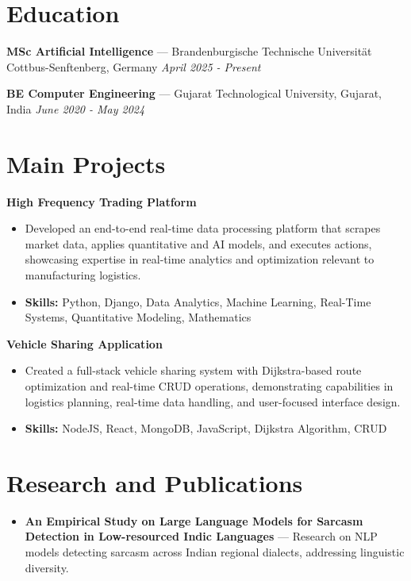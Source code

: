 \documentclass[a4paper,10pt]{article}
\begin{document}
\section*{Education}
\textbf{MSc Artificial Intelligence} — Brandenburgische Technische Universität Cottbus-Senftenberg, Germany \hfill \textit{April 2025 - Present}\par
\vspace{1.5pt}
\textbf{BE Computer Engineering} — Gujarat Technological University, Gujarat, India \hfill \textit{June 2020 - May 2024}\par

\section*{Main Projects}
\textbf{High Frequency Trading Platform}\par
\vspace{1pt}
\begin{itemize}
  \item Developed an end-to-end real-time data processing platform that scrapes market data, applies quantitative and AI models, and executes actions, showcasing expertise in real-time analytics and optimization relevant to manufacturing logistics.
  \item \textbf{Skills:} Python, Django, Data Analytics, Machine Learning, Real-Time Systems, Quantitative Modeling, Mathematics
\end{itemize}
\vspace{3pt}
\textbf{Vehicle Sharing Application}\par
\vspace{1pt}
\begin{itemize}
  \item Created a full-stack vehicle sharing system with Dijkstra-based route optimization and real-time CRUD operations, demonstrating capabilities in logistics planning, real-time data handling, and user-focused interface design.
  \item \textbf{Skills:} NodeJS, React, MongoDB, JavaScript, Dijkstra Algorithm, CRUD
\end{itemize}

\section*{Research and Publications}
\begin{itemize}
\item \textbf{An Empirical Study on Large Language Models for Sarcasm Detection in Low-resourced Indic Languages} — Research on NLP models detecting sarcasm across Indian regional dialects, addressing linguistic diversity.
\end{itemize}
\end{document}
